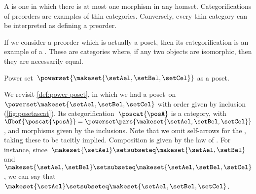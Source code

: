 \begin{remark}
    A  is one in which there is at most one morphism in any homset. Categorifications of preorders are examples of thin categories. Conversely, every thin category can be interpreted as defining a preorder. 
\end{remark}

\begin{remark}
    If we consider a preorder which is actually a poset, then its categorification is an example of a . These are categories where, if any two objects are isomorphic, then they are necessarily equal.
\end{remark}


\begin{marginfigure}
    \centering
    \caption{Power set~$\powerset{\makeset{\setAel,\setBel,\setCel}}$ as a poset.
        \label{fig:posetascat}}
\end{marginfigure}

\begin{example}
    We revisit \cref{def:power-poset}, in which we had a poset~\posA on $\powerset \makeset{\setAel,\setBel,\setCel}$ with order given by inclusion (\cref{fig:posetascat}).
    Its categorification~$\poscat{\posA}$ is a category, with $\Obof{\poscat{\posA}}=\powerset\pars{\makeset{\setAel,\setBel,\setCel}}$, and morphisms given by the inclusions.
    Note that we omit self-arrows for the , taking these to be tacitly implied.
    Composition is given by the  law of .
    For instance, since~$\makeset{\setAel}\setsubseteq \makeset{\setAel,\setBel}$ and~$\makeset{\setAel,\setBel} \setsubseteq \makeset{\setAel,\setBel,\setCel}$, we can say that~$\makeset{\setAel}\setsubseteq \makeset{\setAel,\setBel,\setCel}$.
\end{example}